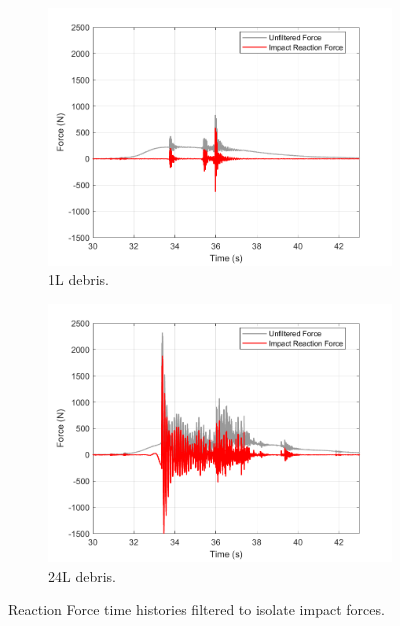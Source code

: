 \documentclass{article}
\begin{document}
\begin{figure}[h!]
    \centering
    \begin{subfigure}[b]{0.9\textwidth}
        \centering
        \includegraphics[width=\textwidth]{Reg_Lift_U_1_L_D__Masters_NHERIDeprisImpact2_goodtests_Reg_Lift_U_1_L_Trial04_Peak.png}
        \caption{1L debris.}
        \label{fig:timehist_1L_peak}
    \end{subfigure}
    \hfill
    \begin{subfigure}[b]{0.9\textwidth}
        \centering
        \includegraphics[width=\textwidth]{Reg_Lift_U_24_L_D__Masters_NHERIDeprisImpact2_goodtests_Reg_Lift_U_24_L_Trial04_Peak.png}
        \caption{24L debris.}
        \label{fig:timehist_24L_peak}
    \end{subfigure}
    \caption{Reaction Force time histories filtered to isolate impact forces.}
    \label{fig:timehist_combined}
\end{figure}
\end{document}
